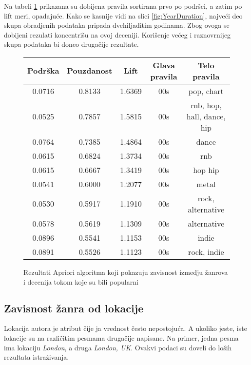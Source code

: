 Na tabeli \ref{fig:aprioriDecade} prikazana su dobijena pravila sortirana prvo po podr\v{s}ci, a zatim po lift meri, opadaju\'c{}e.
Kako se kasnije vidi na slici \ref{fig:YearDuration}, najve\'c{}i deo skupa obradjenih podataka pripada dvehiljaditim godinama. Zbog ovoga se dobijeni rezulati koncentri\v{s}u na ovoj deceniji. Kori\v{s}enje ve\'c{}eg i raznovrnijeg skupa podataka bi doneo druga\v{c}ije rezultate.

\begin{figure}[H]
    \footnotesize
    \centering
    \begin{tabular}{|c|c|c|c|c|}
        \hline
        Podr\v{s}ka & Pouzdanost & Lift & Glava pravila  & Telo pravila \\
        \hline
        0.0716 & 0.8133 & 1.6369 & 00s & pop, chart \\
        0.0525 & 0.7857 & 1.5815 & 00s & rnb, hop, hall, dance, hip \\
        0.0764 & 0.7385 & 1.4864 & 00s & dance \\
        0.0615 & 0.6824 & 1.3734 & 00s & rnb \\
        0.0615 & 0.6667 & 1.3419 & 00s & hop hip \\
        0.0541 & 0.6000 & 1.2077 & 00s & metal \\
        0.0530 & 0.5917 & 1.1910 & 00s & rock, alternative \\
        0.0578 & 0.5619 & 1.1309 & 00s & alternative \\
        0.0896 & 0.5541 & 1.1153 & 00s & indie \\
        0.0891 & 0.5526 & 1.1123 & 00s & rock, indie \\
        \hline
    \end{tabular}
    \caption{Rezultati Apriori algoritma koji pokazuju zavisnost izmedju \v{z}anrova i decenija tokom koje su bili popularni}
    \label{fig:aprioriDecade}
\end{figure}


\subsection{Zavisnost \v{z}anra od lokacije}
\label{subsec:AprioriZavisnostZanraOdLokacije}

Lokacija autora je atribut \v{c}ije ja vrednost \v{c}esto nepostoju\'c{}a. A ukoliko jeste, iste lokacije su na razli\v{c}itim pesmama druga\v{c}ije napisane. Na primer, jedna pesma ima lokaciju \emph{London}, a druga \emph{London, UK}. Ovakvi podaci su doveli do lo\v{s}ih rezultata istra\v{z}ivanja.
